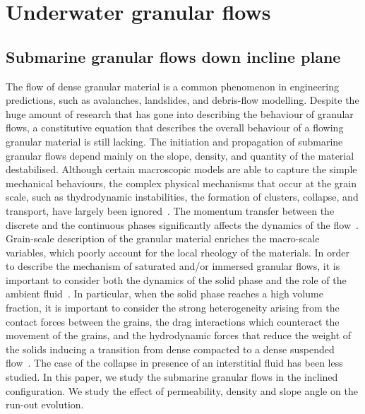 \chapter{Underwater granular flows}

\ifpdf
    \graphicspath{{Chapter6/figs/raster/}{Chapter6/figs/pdf/}{Chapter6/figs/}}
\else
    \graphicspath{{Chapter6/figs/vector/}{Chapter6/figs/}}
\fi

\section{Submarine granular flows down incline plane}

The flow of dense granular material is a common phenomenon in engineering predictions, such as avalanches, landslides, and debris-flow modelling. Despite the huge amount of research that has gone into describing the behaviour of granular flows, a constitutive equation that describes the overall behaviour of a flowing granular material is still lacking. The initiation and propagation of submarine granular flows depend mainly on the slope, density, and quantity of the material destabilised. Although certain macroscopic models are able to capture the simple mechanical behaviours, the complex physical mechanisms that occur at the grain scale, such as thydrodynamic instabilities, the formation of clusters, collapse, and transport, have largely been ignored~\citep{Topin2011}. The momentum transfer between the discrete and the continuous phases significantly affects the dynamics of the flow~\citep{Peker2007}. Grain-scale description of the granular material enriches the macro-scale variables,  which poorly account for the local rheology of the materials.  In order to describe the mechanism of saturated and/or immersed granular flows, it is important to consider both the dynamics of the solid phase and the role of the ambient fluid~\citep{Denlinger2001}. In particular, when the solid phase reaches a high volume fraction, it is important to consider the strong heterogeneity arising from the contact forces between the grains, the drag interactions which counteract the movement of the grains, and the hydrodynamic forces that reduce the weight of the solids inducing a transition from dense compacted to a dense suspended flow~\citep{Meruane2010}. The case of the collapse in presence of an interstitial fluid has been less studied. In this paper, we study the submarine granular flows in the inclined configuration. We study the effect of permeability, density and slope angle on the run-out evolution.


